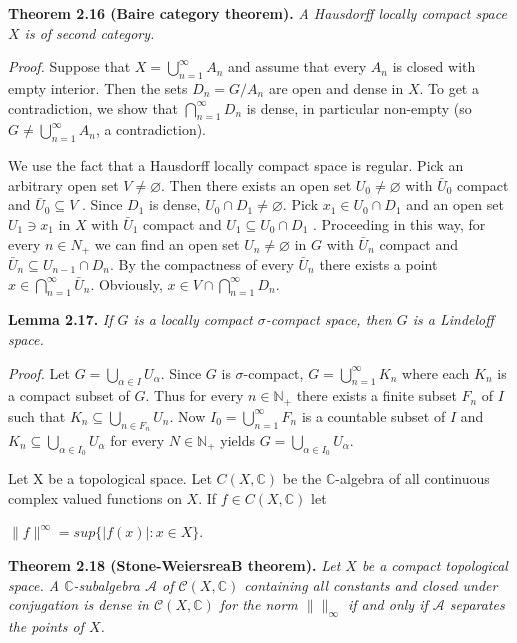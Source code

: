 \documentclass[12pt]{article}
\begin{document}
\textbf{Theorem 2.16 (Baire category theorem).} \emph{A Hausdorff locally compact space $ X $ is of second category.}


    \emph{Proof.} Suppose that $ X = \bigcup^{\infty}_{n=1} A_n $ and assume that every $ A_n $ is closed with empty interior. Then the sets
$ D_n = G / A_n $ are open and dense in $ X $. To get a contradiction, we show that $ \bigcap^{\infty}_{n=1} D_n $ is dense, in particular
non-empty (so $ G \neq \bigcup^{\infty}_{n=1} A_n $, a contradiction).


    We use the fact that a Hausdorff locally compact space is regular. Pick an arbitrary open set $ V \neq \varnothing $. Then
there exists an open set $ U_0 \neq \varnothing $ with $ \bar{U}_0 $ compact and $ \bar{U}_0 \subseteq V $ . Since $ D_1 $ is dense, $ U_0 \cap D_1 \neq \varnothing $. Pick $ x_1 \in U_0 \cap D_1 $
and an open set $ U_1 \ni x_1 $ in $ X $ with $ \bar{U}_1 $ compact and $ U_1 \subseteq U_0 \cap D_1 $ . Proceeding in this way, for every $ n \in N_+ $
we can find an open set $ U_n \neq \varnothing $ in $ G $ with $\bar{U}_n$ compact and $ \bar{U}_n \subseteq U_{n-1} \cap D_n $. By the compactness of every $ \bar{U}_n $
there exists a point $ x \in \bigcap^{\infty}_{n=1} \bar{U}_n $. Obviously, $ x \in V \cap \bigcap^{\infty}_{n=1} D_n $.


\textbf{Lemma 2.17.} \emph{If $ G $ is a locally compact $\sigma$-compact space, then $ G $ is a Lindeloff space.}


\emph{Proof.} Let $ G = \bigcup_{\alpha \in I} U_{\alpha} $. Since $ G $ is $\sigma$-compact, $ G = \bigcup^{\infty}_{n=1} K_n $ where each $ K_n $ is a compact subset of $ G $.
Thus for every $ n \in \mathbb{N}_+ $ there exists a finite subset $ F_n $ of $ I $ such that $ K_n \subseteq \bigcup_{n \in F_n} U_n $. Now $ I_0 = \bigcup^{\infty}_{n=1} F_n $ is a
countable subset of $ I $ and $ K_n \subseteq \bigcup_{\alpha \in I_0} U_{\alpha} $ for every $ N \in \mathbb{N}_+ $ yields $ G = \bigcup_{\alpha \in I_0} U_{\alpha} $.
    

    Let X be a topological space. Let $ C(X, \mathbb{C}) $ be the $\mathbb{C}$-algebra of all continuous complex valued functions on
$ X $. If $ f \in C(X, \mathbb{C}) $ let


$\|f\|^{\infty} = sup\{|f(x)| : x \in X\}$.


\textbf{Theorem 2.18 (Stone-WeiersreaB theorem).} \emph{Let $ X $ be a compact topological space. A $\mathbb{C}$-subalgebra $ \mathcal{A} $ of
$ \mathcal{C}(X, \mathbb{C}) $ containing all constants and closed under conjugation is dense in $ \mathcal{C}(X, \mathbb{C}) $ for the norm $ \| \|_{\infty} $ if and
only if $ \mathcal{A} $ separates the points of $ X $.}
\end{document}
